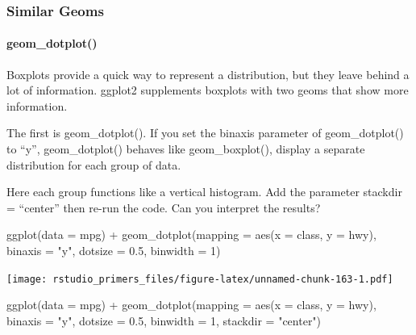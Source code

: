 \documentclass[
]{article}
\newenvironment{Shaded}{\begin{snugshade}}{\end{snugshade}}
\newcommand{\AttributeTok}[1]{\textcolor[rgb]{0.77,0.63,0.00}{#1}}
\newcommand{\DecValTok}[1]{\textcolor[rgb]{0.00,0.00,0.81}{#1}}
\newcommand{\FloatTok}[1]{\textcolor[rgb]{0.00,0.00,0.81}{#1}}
\newcommand{\FunctionTok}[1]{\textcolor[rgb]{0.00,0.00,0.00}{#1}}
\newcommand{\NormalTok}[1]{#1}
\newcommand{\SpecialCharTok}[1]{\textcolor[rgb]{0.00,0.00,0.00}{#1}}
\newcommand{\StringTok}[1]{\textcolor[rgb]{0.31,0.60,0.02}{#1}}
\begin{document}
\hypertarget{similar-geoms-1}{%
\subsubsection{Similar Geoms}\label{similar-geoms-1}}

\hypertarget{geom_dotplot-1}{%
\paragraph{geom\_dotplot()}\label{geom_dotplot-1}}

Boxplots provide a quick way to represent a distribution, but they leave
behind a lot of information. ggplot2 supplements boxplots with two geoms
that show more information.

The first is geom\_dotplot(). If you set the binaxis parameter of
geom\_dotplot() to ``y'', geom\_dotplot() behaves like geom\_boxplot(),
display a separate distribution for each group of data.

Here each group functions like a vertical histogram. Add the parameter
stackdir = ``center'' then re-run the code. Can you interpret the
results?

\begin{Shaded}
\begin{Highlighting}[]
\FunctionTok{ggplot}\NormalTok{(}\AttributeTok{data =}\NormalTok{ mpg) }\SpecialCharTok{+}
  \FunctionTok{geom\_dotplot}\NormalTok{(}\AttributeTok{mapping =} \FunctionTok{aes}\NormalTok{(}\AttributeTok{x =}\NormalTok{ class, }\AttributeTok{y =}\NormalTok{ hwy), }\AttributeTok{binaxis =} \StringTok{"y"}\NormalTok{, }
               \AttributeTok{dotsize =} \FloatTok{0.5}\NormalTok{, }\AttributeTok{binwidth =} \DecValTok{1}\NormalTok{)}
\end{Highlighting}
\end{Shaded}

\texttt{[image: rstudio\_primers\_files/figure-latex/unnamed-chunk-163-1.pdf]}

\begin{Shaded}
\begin{Highlighting}[]
\FunctionTok{ggplot}\NormalTok{(}\AttributeTok{data =}\NormalTok{ mpg) }\SpecialCharTok{+}
  \FunctionTok{geom\_dotplot}\NormalTok{(}\AttributeTok{mapping =} \FunctionTok{aes}\NormalTok{(}\AttributeTok{x =}\NormalTok{ class, }\AttributeTok{y =}\NormalTok{ hwy), }\AttributeTok{binaxis =} \StringTok{"y"}\NormalTok{, }
               \AttributeTok{dotsize =} \FloatTok{0.5}\NormalTok{, }\AttributeTok{binwidth =} \DecValTok{1}\NormalTok{, }\AttributeTok{stackdir =} \StringTok{"center"}\NormalTok{)}
\end{Highlighting}
\end{Shaded}
\end{document}
